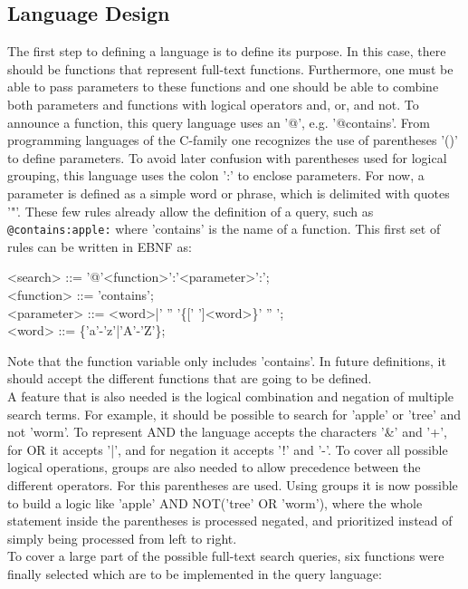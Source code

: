 \subsection{Language Design}
The first step to defining a language is to define its purpose. In this case, there should be functions that represent full-text functions. Furthermore, one must be able to pass parameters to these functions and one should be able to combine both parameters and functions with logical operators and, or, and not.
To announce a function, this query language uses an '@', e.g. '@contains'. From programming languages of the C-family one recognizes the use of parentheses '()' to define parameters. To avoid later confusion with parentheses used for logical grouping, this language uses the colon ':' to enclose parameters. For now, a parameter is defined as a simple word or phrase, which is delimited with quotes '"'. These few rules already allow the definition of a query, such as \lstinline[language=Fulltext-Search]$@contains:apple:$ where 'contains' is the name of a function.
This first set of rules can be written in \ac{EBNF} as:
\begin{grammar}
    <search> ::= '@'<function>':'<parameter>':'; \\
    <function> ::= 'contains'; \\
    <parameter> ::= <word>|' '' '\{[' ']<word>\}' '' '; \\
    <word> ::= \{'a'-'z'|'A'-'Z'\};
\end{grammar}
Note that the function variable only includes 'contains'. In future definitions, it should accept the different functions that are going to be defined.\\
A feature that is also needed is the logical combination and negation of multiple search terms. For example, it should be possible to search for 'apple' or 'tree' and not 'worm'. To represent AND the language accepts the characters '\&' and '+', for OR it accepts '|', and for negation it accepts '!' and '-'. To cover all possible logical operations, groups are also needed to allow precedence between the different operators. For this parentheses are used. Using groups it is now possible to build a logic like 'apple' AND NOT('tree' OR 'worm'), where the whole statement inside the parentheses is processed negated, and prioritized instead of simply being processed from left to right.\\
To cover a large part of the possible full-text search queries, six functions were finally selected which are to be implemented in the query language:\\
